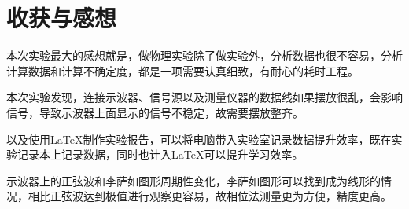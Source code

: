 \documentclass[1pt]{article}
\begin{document}
\section{收获与感想}
本次实验最大的感想就是，做物理实验除了做实验外，分析数据也很不容易，分析计算数据和计算不确定度，都是一项需要认真细致，有耐心的耗时工程。

本次实验发现，连接示波器、信号源以及测量仪器的数据线如果摆放很乱，会影响信号，导致示波器上面显示的信号不稳定，故需要摆放整齐。

以及使用\LaTeX 制作实验报告，可以将电脑带入实验室记录数据提升效率，既在实验记录本上记录数据，同时也计入\LaTeX 可以提升学习效率。

示波器上的正弦波和李萨如图形周期性变化，李萨如图形可以找到成为线形的情况，相比正弦波达到极值进行观察更容易，故相位法测量更为方便，精度更高。
\end{document}
